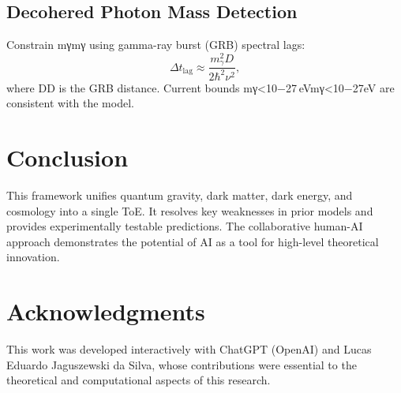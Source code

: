 \documentclass{article}
\begin{document}
\subsection{Decohered Photon Mass Detection}
Constrain mγmγ​ using gamma-ray burst (GRB) spectral lags:
\begin{equation}
\Delta t_{\text{lag}} \approx \frac{m_{\gamma}^2 D}{2\hbar^2 \nu^2}, \label{eq:grb }
\end{equation}
where DD is the GRB distance. Current bounds mγ<10−27 eVmγ​<10−27eV are consistent with the model.

\section{Conclusion}
This framework unifies quantum gravity, dark matter, dark energy, and cosmology into a single ToE. It resolves key weaknesses in prior models and provides experimentally testable predictions. The collaborative human-AI approach demonstrates the potential of AI as a tool for high-level theoretical innovation.

\section*{Acknowledgments}
This work was developed interactively with ChatGPT (OpenAI) and Lucas Eduardo Jaguszewski da Silva, whose contributions were essential to the theoretical and computational aspects of this research.



\end{document}
